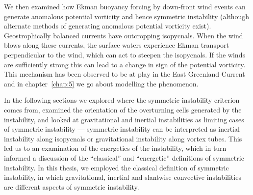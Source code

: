 We then examined how Ekman buoyancy forcing by down-front wind events can generate anomalous potential vorticity and hence symmetric instability (although alternate methods of generating anomalous potential vorticity exist). Geostrophically balanced currents have outcropping isopycnals. When the wind blows along these currents, the surface waters experience Ekman transport perpendicular to the wind, which can act to steepen the isopycnals. If the winds are sufficiently strong this can lead to a change in sign of the potential vorticity. This mechanism has been observed to be at play in the East Greenland Current and in chapter~\ref{chap:5} we go about modelling the phenomenon.

In the following sections we explored where the symmetric instability criterion comes from, examined the orientation of the overturning cells generated by the instability, and looked at gravitational and inertial instabilities as limiting cases of symmetric instability --- symmetric instability can be interpreted as inertial instability along isopycnals or gravitational instability along vortex tubes. This led us to an examination of the energetics of the instability, which in turn informed a discussion of the ``classical'' and ``energetic'' definitions of symmetric instability. In this thesis, we employed the classical definition of symmetric instability, in which gravitational, inertial and slantwise convective instabilities are different aspects of symmetric instability.

